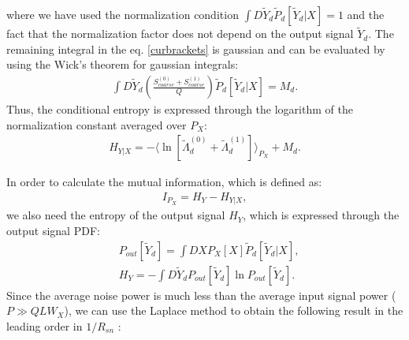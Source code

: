 \documentclass{article}
\begin{document}
where we have used the normalization condition $\int D\tilde{Y}_{d} \tilde{P}_{d}[\tilde{Y}_{d}|X] = 1$ and the fact that the normalization factor does not depend on the output signal $\tilde{Y}_{d}$. The remaining integral in the eq. \eqref{curbrackets} is gaussian and can be evaluated by using the Wick's theorem for gaussian integrals: 
\begin{eqnarray}
    \int D\tilde{Y}_{d} \left( \frac{S_{coarse}^{(0)} + S_{coarse}^{(1)}}{Q}\right) \tilde{P}_{d}[\tilde{Y}_{d}|X] = M_{d}.
\end{eqnarray}
Thus, the conditional entropy is expressed through the logarithm of the normalization constant averaged over $P_{X}$: 
\begin{eqnarray}
    H_{Y|X} = -  \langle\ln [\tilde{\Lambda}_{d}^{(0)} + \tilde{\Lambda}_{d}^{(1)}]\rangle_{P_{X}} + M_{d}.
\end{eqnarray}

In order to calculate the mutual information, which is defined as:
\begin{eqnarray}
    I_{P_{X}} = H_{Y} - H_{Y|X},
\end{eqnarray}
we also need the entropy of the output signal $H_{Y}$, which is expressed through the output signal PDF: 
\begin{eqnarray}
    &P_{out}[\tilde{Y}_{d}] = \int DX P_{X}[X] \tilde{P}_{d}[\tilde{Y}_{d}|X], \\
    &H_{Y} = - \int D\tilde{Y}_{d} P_{out}[\tilde{Y}_{d}] \ln P_{out}[\tilde{Y}_{d}].\label{H[Ytilde]}
\end{eqnarray} 
Since the average noise power is much less than the average input signal power ($P \gg QLW_{X}$), we can use the Laplace method to obtain the following result in the leading order in $1/R_{sn}$ \cite{terekhov2016calculation}:
\end{document}

